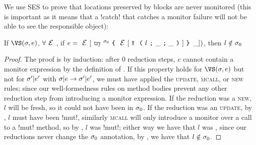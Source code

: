 We use SES to prove that locations preserved by \Q@try@ blocks are never monitored (this is important as it means that a \Q!catch! that catches a monitor failure will not be able to see the responsible object):%
\SS\begin{Lemma}\rm
	If $\VS(\s, e)$, $\forall \E$, if $e = \E[\Kw{try}^{\s_0}\oC\E[\M{l}{\_}{\_}]\cC\,\_])$, then $l\notin\sigma_0$
\end{Lemma}\SS
\begin{proof}
The proof is by induction: after 0 reduction steps, $e$ cannot contain a monitor expression by the definition of \VS. If this property holds for $\VS(\s, e)$ but not for $\sigma'|e'$ with $\sigma|e\rightarrow \sigma'|e'$, we must have applied the \textsc{update}, \textsc{mcall}, or \textsc{new} rules; since our well-formedness rules on method bodies prevent any other reduction step from introducing a monitor expression. If the reduction was a \textsc{new}, $l$ will be fresh, so it could not have been in $\sigma_0$. If the reduction was an \textsc{update}, by , $l$ must have been \Q!mut!, similarly \textsc{mcall} will only introduce a monitor over a call to a \Q!mut! method, so by , $l$ was \Q!mut!; either way we have that $l$ was \muty, since our reductions never change the $\sigma_0$ annotation, by , we have that $l \notin \sigma_0$.
\end{proof}

